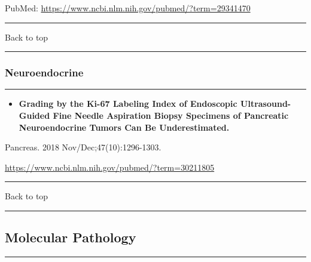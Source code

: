 \documentclass[]{article}
\providecommand{\tightlist}{%
  \setlength{\itemsep}{0pt}\setlength{\parskip}{0pt}}
\begin{document}
PubMed: \url{https://www.ncbi.nlm.nih.gov/pubmed/?term=29341470}

{}

{}

\begin{center}\rule{0.5\linewidth}{\linethickness}\end{center}

Back to top

\begin{center}\rule{0.5\linewidth}{\linethickness}\end{center}

\pagebreak

\hypertarget{neuroendocrine-1}{%
\subsubsection{Neuroendocrine}\label{neuroendocrine-1}}

\begin{center}\rule{0.5\linewidth}{\linethickness}\end{center}

\begin{itemize}
\tightlist
\item
  \textbf{Grading by the Ki-67 Labeling Index of Endoscopic
  Ultrasound-Guided Fine Needle Aspiration Biopsy Specimens of
  Pancreatic Neuroendocrine Tumors Can Be Underestimated.}
\end{itemize}

Pancreas. 2018 Nov/Dec;47(10):1296-1303.

\url{https://www.ncbi.nlm.nih.gov/pubmed/?term=30211805}

\begin{center}\rule{0.5\linewidth}{\linethickness}\end{center}

Back to top

\begin{center}\rule{0.5\linewidth}{\linethickness}\end{center}

\pagebreak

\hypertarget{molecular-pathology}{%
\subsection{Molecular Pathology}\label{molecular-pathology}}

\begin{center}\rule{0.5\linewidth}{\linethickness}\end{center}
\end{document}
